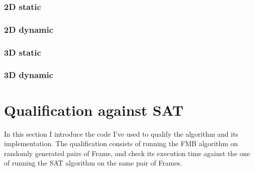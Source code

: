 \documentclass[12pt, a4paper]{article}
\begin{document}
\subsubsection{2D static}

\begin{scriptsize}
\begin{ttfamily}

\end{ttfamily}
\end{scriptsize}

\subsubsection{2D dynamic}

\begin{scriptsize}
\begin{ttfamily}

\end{ttfamily}
\end{scriptsize}

\subsubsection{3D static}

\begin{scriptsize}
\begin{ttfamily}

\end{ttfamily}
\end{scriptsize}

\subsubsection{3D dynamic}

\begin{scriptsize}
\begin{ttfamily}

\end{ttfamily}
\end{scriptsize}

\section{Qualification against SAT}

In this section I introduce the code I've used to qualify the algorithm and its implementation. The qualification consists of running the FMB algorithm on randomly generated pairs of Frame, and check its execution time against the one of running the SAT algorithm on the same pair of Frames.\\
\end{document}
